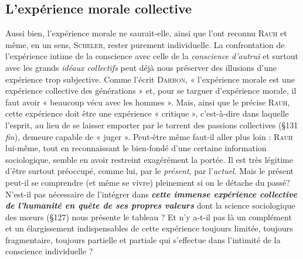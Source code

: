 \subsection{L'expérience morale collective}%
Aussi bien, l’expérience
morale ne saurait-elle, ainsi que l’ont reconnu \textsc{Rauh} et même, en un
sens, \textsc{Scheler}, rester purement individuelle. La confrontation de
l’expérience intime de la conscience avec celle de la {\it conscience d'autrui}
et surtout avec les grands {\it idéaux collectifs} peut déjà nous préserver
des illusions d’une expérience trop subjective. Comme l’écrit \textsc{Darbon},
« l'expérience morale est une expérience collective des générations » et,
pour se targuer d’expérience morale, il faut avoir « beaucoup vécu avec
les hommes ». Mais, ainsi que le précise \textsc{Rauh}, cette expérience doit
être une expérience « critique », c’est-à-dire dans laquelle l'esprit,
au lieu de se laisser emporter par le torrent des passions collectives
(\S 131 {\it fin}), demeure capable de « juger ». Peut-être même faut-il
aller plus loin : \textsc{Rauh} lui-même, tout en reconnaissant le bien-fondé
d’une certaine information sociologique, semble en avoir restreint
exagérément la portée. Il est très légitime d’être surtout préoccupé,
comme lui, par le {\it présent}, par l’{\it actuel}. Mais le présent peut-il se
comprendre (et même se vivre) pleinement si on le détache du passé?
N’est-il pas nécessaire de l’intégrer dans \textbf{\textit {cette immense expérience
collective de l'humanité en quête de ses propres valeurs}} dont la
science sociologique des mœurs (\S 127) nous présente le tableau ?
Et n’y a-t-il pas là un complément et un élargissement indispensables
de cette expérience toujours limitée, toujours fragmentaire, toujours
partielle et partiale qui s’effectue dans l'intimité de la conscience
individuelle ?

